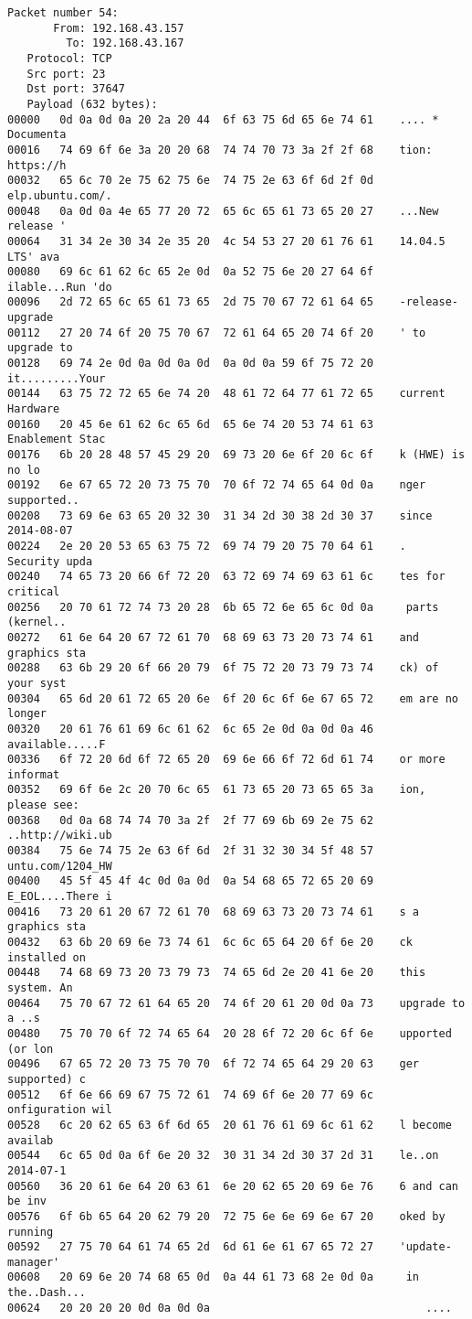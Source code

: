 \documentclass[a4paper,12pt]{article}
\begin{document}
\begin{verbatim}
Packet number 54:
       From: 192.168.43.157
         To: 192.168.43.167
   Protocol: TCP
   Src port: 23
   Dst port: 37647
   Payload (632 bytes):
00000   0d 0a 0d 0a 20 2a 20 44  6f 63 75 6d 65 6e 74 61    .... * Documenta
00016   74 69 6f 6e 3a 20 20 68  74 74 70 73 3a 2f 2f 68    tion:  https://h
00032   65 6c 70 2e 75 62 75 6e  74 75 2e 63 6f 6d 2f 0d    elp.ubuntu.com/.
00048   0a 0d 0a 4e 65 77 20 72  65 6c 65 61 73 65 20 27    ...New release '
00064   31 34 2e 30 34 2e 35 20  4c 54 53 27 20 61 76 61    14.04.5 LTS' ava
00080   69 6c 61 62 6c 65 2e 0d  0a 52 75 6e 20 27 64 6f    ilable...Run 'do
00096   2d 72 65 6c 65 61 73 65  2d 75 70 67 72 61 64 65    -release-upgrade
00112   27 20 74 6f 20 75 70 67  72 61 64 65 20 74 6f 20    ' to upgrade to 
00128   69 74 2e 0d 0a 0d 0a 0d  0a 0d 0a 59 6f 75 72 20    it.........Your 
00144   63 75 72 72 65 6e 74 20  48 61 72 64 77 61 72 65    current Hardware
00160   20 45 6e 61 62 6c 65 6d  65 6e 74 20 53 74 61 63     Enablement Stac
00176   6b 20 28 48 57 45 29 20  69 73 20 6e 6f 20 6c 6f    k (HWE) is no lo
00192   6e 67 65 72 20 73 75 70  70 6f 72 74 65 64 0d 0a    nger supported..
00208   73 69 6e 63 65 20 32 30  31 34 2d 30 38 2d 30 37    since 2014-08-07
00224   2e 20 20 53 65 63 75 72  69 74 79 20 75 70 64 61    .  Security upda
00240   74 65 73 20 66 6f 72 20  63 72 69 74 69 63 61 6c    tes for critical
00256   20 70 61 72 74 73 20 28  6b 65 72 6e 65 6c 0d 0a     parts (kernel..
00272   61 6e 64 20 67 72 61 70  68 69 63 73 20 73 74 61    and graphics sta
00288   63 6b 29 20 6f 66 20 79  6f 75 72 20 73 79 73 74    ck) of your syst
00304   65 6d 20 61 72 65 20 6e  6f 20 6c 6f 6e 67 65 72    em are no longer
00320   20 61 76 61 69 6c 61 62  6c 65 2e 0d 0a 0d 0a 46     available.....F
00336   6f 72 20 6d 6f 72 65 20  69 6e 66 6f 72 6d 61 74    or more informat
00352   69 6f 6e 2c 20 70 6c 65  61 73 65 20 73 65 65 3a    ion, please see:
00368   0d 0a 68 74 74 70 3a 2f  2f 77 69 6b 69 2e 75 62    ..http://wiki.ub
00384   75 6e 74 75 2e 63 6f 6d  2f 31 32 30 34 5f 48 57    untu.com/1204_HW
00400   45 5f 45 4f 4c 0d 0a 0d  0a 54 68 65 72 65 20 69    E_EOL....There i
00416   73 20 61 20 67 72 61 70  68 69 63 73 20 73 74 61    s a graphics sta
00432   63 6b 20 69 6e 73 74 61  6c 6c 65 64 20 6f 6e 20    ck installed on 
00448   74 68 69 73 20 73 79 73  74 65 6d 2e 20 41 6e 20    this system. An 
00464   75 70 67 72 61 64 65 20  74 6f 20 61 20 0d 0a 73    upgrade to a ..s
00480   75 70 70 6f 72 74 65 64  20 28 6f 72 20 6c 6f 6e    upported (or lon
00496   67 65 72 20 73 75 70 70  6f 72 74 65 64 29 20 63    ger supported) c
00512   6f 6e 66 69 67 75 72 61  74 69 6f 6e 20 77 69 6c    onfiguration wil
00528   6c 20 62 65 63 6f 6d 65  20 61 76 61 69 6c 61 62    l become availab
00544   6c 65 0d 0a 6f 6e 20 32  30 31 34 2d 30 37 2d 31    le..on 2014-07-1
00560   36 20 61 6e 64 20 63 61  6e 20 62 65 20 69 6e 76    6 and can be inv
00576   6f 6b 65 64 20 62 79 20  72 75 6e 6e 69 6e 67 20    oked by running 
00592   27 75 70 64 61 74 65 2d  6d 61 6e 61 67 65 72 27    'update-manager'
00608   20 69 6e 20 74 68 65 0d  0a 44 61 73 68 2e 0d 0a     in the..Dash...
00624   20 20 20 20 0d 0a 0d 0a                                 ....


\end{verbatim}
\end{document}
